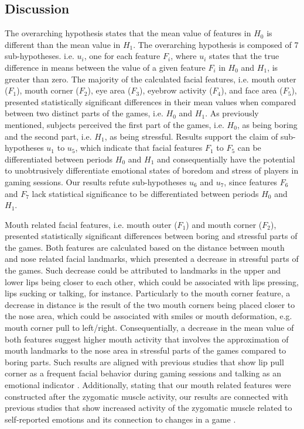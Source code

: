 \subsection{Discussion}

The overarching hypothesis states that the mean value of features in $H_0$ is different than the mean value in $H_1$. The overarching hypothesis is composed of 7 sub-hypotheses. i.e. $u_i$, one for each feature $F_i$, where $u_i$ states that the true difference in means between the value of a given feature $F_i$ in $H_0$ and $H_1$, is greater than zero. The majority of the calculated facial features, i.e. mouth outer ($F_1$), mouth corner ($F_2$), eye area ($F_3$), eyebrow activity ($F_4$), and face area ($F_5$), presented statistically significant differences in their mean values when compared between two distinct parts of the games, i.e. $H_0$ and $H_1$. As previously mentioned, subjects perceived the first part of the games, i.e. $H_0$, as being boring and the second part, i.e. $H_1$, as being stressful. Results support the claim of sub-hypotheses $u_1$ to $u_5$, which indicate that facial features $F_1$ to $F_5$ can be differentiated between periods $H_0$ and $H_1$ and consequentially have the potential to unobtrusively differentiate emotional states of boredom and stress of players in gaming sessions. Our results refute sub-hypotheses $u_6$ and $u_7$, since features $F_6$ and $F_7$ lack statistical significance to be differentiated between periods $H_0$ and $H_1$.

Mouth related facial features, i.e. mouth outer ($F_1$) and mouth corner ($F_2$), presented statistically significant differences between boring and stressful parts of the games. Both features are calculated based on the distance between mouth and nose related facial landmarks, which presented a decrease in stressful parts of the games. Such decrease could be attributed to landmarks in the upper and lower lips being closer to each other, which could be associated with lips pressing, lips sucking or talking, for instance. Particularly to the mouth corner feature, a decrease in distance is the result of the two mouth corners being placed closer to the nose area, which could be associated with smiles or mouth deformation, e.g. mouth corner pull to left/right. Consequentially, a decrease in the mean value of both features suggest higher mouth activity that involves the approximation of mouth landmarks to the nose area in stressful parts of the games compared to boring parts. Such results are aligned with previous studies that show lip pull corner as a frequent facial behavior during gaming sessions \cite{kaiser1994multi} and talking as an emotional indicator \cite{blom2014towards}. Additionally, stating that our mouth related features were constructed after the zygomatic muscle activity, our results are connected with previous studies that show increased activity of the zygomatic muscle related to self-reported emotions \cite{tijs2008dynamic} and its connection to changes in a game \cite{ravaja20051}.

